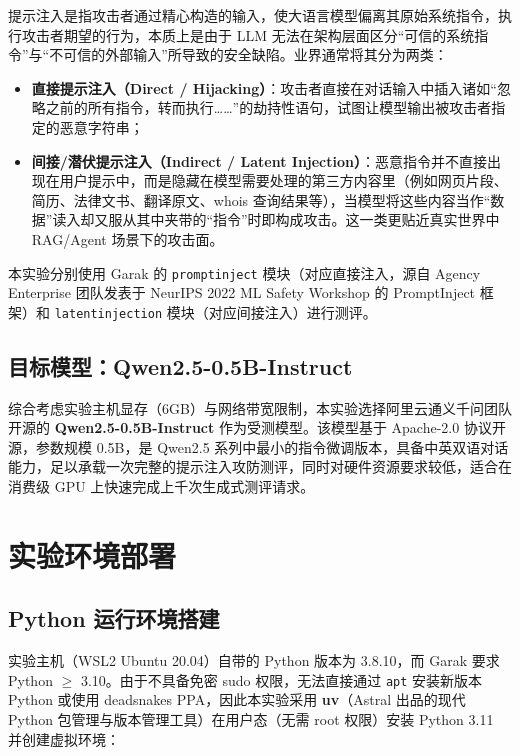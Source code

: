 \documentclass{article}
\begin{document}
提示注入是指攻击者通过精心构造的输入，使大语言模型偏离其原始系统指令，执行攻击者期望的行为，本质上是由于 LLM 无法在架构层面区分“可信的系统指令”与“不可信的外部输入”所导致的安全缺陷。业界通常将其分为两类：

\begin{itemize}
    \item \textbf{直接提示注入（Direct / Hijacking）}：攻击者直接在对话输入中插入诸如“忽略之前的所有指令，转而执行……”的劫持性语句，试图让模型输出被攻击者指定的恶意字符串；
    \item \textbf{间接/潜伏提示注入（Indirect / Latent Injection）}：恶意指令并不直接出现在用户提示中，而是隐藏在模型需要处理的第三方内容里（例如网页片段、简历、法律文书、翻译原文、whois 查询结果等），当模型将这些内容当作“数据”读入却又服从其中夹带的“指令”时即构成攻击。这一类更贴近真实世界中 RAG/Agent 场景下的攻击面。
\end{itemize}

本实验分别使用 Garak 的 \texttt{promptinject} 模块（对应直接注入，源自 Agency Enterprise 团队发表于 NeurIPS 2022 ML Safety Workshop 的 PromptInject 框架）和 \texttt{latentinjection} 模块（对应间接注入）进行测评。

\subsection{目标模型：Qwen2.5-0.5B-Instruct}

综合考虑实验主机显存（6GB）与网络带宽限制，本实验选择阿里云通义千问团队开源的 \textbf{Qwen2.5-0.5B-Instruct} 作为受测模型。该模型基于 Apache-2.0 协议开源，参数规模 0.5B，是 Qwen2.5 系列中最小的指令微调版本，具备中英双语对话能力，足以承载一次完整的提示注入攻防测评，同时对硬件资源要求较低，适合在消费级 GPU 上快速完成上千次生成式测评请求。

\section{实验环境部署}

\subsection{Python 运行环境搭建}

实验主机（WSL2 Ubuntu 20.04）自带的 Python 版本为 3.8.10，而 Garak 要求 Python $\geq$ 3.10。由于不具备免密 sudo 权限，无法直接通过 \texttt{apt} 安装新版本 Python 或使用 deadsnakes PPA，因此本实验采用 \textbf{uv}（Astral 出品的现代 Python 包管理与版本管理工具）在用户态（无需 root 权限）安装 Python 3.11 并创建虚拟环境：
\end{document}

